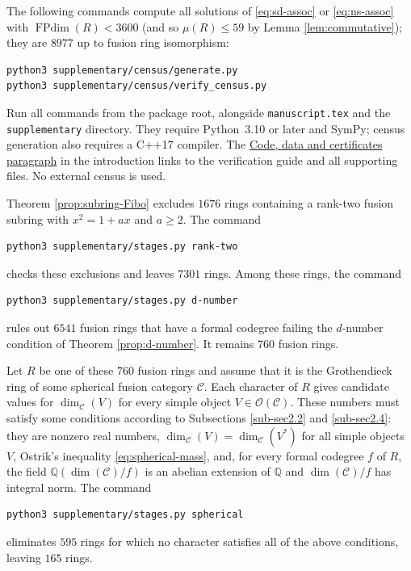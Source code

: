 \documentclass[11pt]{amsart}
\theoremstyle{definition}
\DeclareMathOperator{\FPdim}{FPdim}
\newcommand{\Q}{\mathbb Q}
\numberwithin{equation}{section}
\begin{document}
The following commands compute all solutions of \eqref{eq:sd-assoc} or \eqref{eq:ns-assoc} with $\FPdim(R)<3600$ (and so $\mu(R)\leq 59$ by Lemma \ref{lem:commutative}); they are $8977$ up to fusion ring isomorphism:
\begin{verbatim}
python3 supplementary/census/generate.py   
python3 supplementary/census/verify_census.py 
\end{verbatim}

Run all commands from the package root, alongside
\texttt{manuscript.tex} and the \texttt{supplementary} directory.
They require Python~3.10 or later and SymPy; census generation also
requires a C++17 compiler. The
\hyperlink{code-data-certificates}{Code, data and certificates paragraph}
in the introduction links to the verification guide and all supporting files.
No external census is used.

Theorem \ref{prop:subring-Fibo} excludes $1676$ rings containing a rank-two fusion subring with $x^2=1+ax$ and $a\geq2$.
The command
\begin{verbatim}
python3 supplementary/stages.py rank-two
\end{verbatim}
checks these exclusions and leaves $7301$ rings.
Among these rings, the command
\begin{verbatim}
python3 supplementary/stages.py d-number
\end{verbatim}
rules out $6541$ fusion rings that have a formal codegree failing the
$d$-number condition of Theorem \ref{prop:d-number}. 
It remains $760$ fusion rings.

Let $R$ be one of these $760$ fusion rings and assume that it is the Grothendieck ring of some spherical fusion category $\mathcal{C}$. 
Each character of $R$ gives candidate values for $\dim_\mathcal{C}(V)$ for every simple object $V\in \mathcal{O}(\mathcal{C})$. 
These numbers must satisfy some conditions according to Subsections \ref{sub-sec2.2} and \ref{sub-sec2.4}: they are nonzero real numbers, $\dim_\mathcal{C}(V)=\dim_\mathcal{C}(V^*)$ for all simple objects $V$, Ostrik's inequality \eqref{eq:spherical-mass}, and, for every formal codegree $f$ of $R$, the field $\Q(\dim(\mathcal{C})/f)$ is an abelian extension of $\Q$ and $\dim(\mathcal{C})/f$ has integral norm. 
The command
\begin{verbatim}
python3 supplementary/stages.py spherical
\end{verbatim}
eliminates $595$ rings for which no character satisfies all of the above conditions, leaving $165$ rings.
\end{document}

